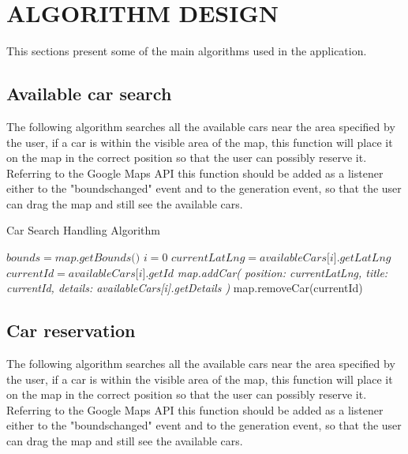 \section{ALGORITHM DESIGN}

This sections present some of the main algorithms used in the application.

\subsection{Available car search}
The following algorithm searches all the available cars near the area specified by the user, if a car
is within the visible area of the map, this function will place it on the map in the correct position
so that the user can possibly reserve it. Referring to the Google Maps API this function should be
added as a listener either to the "bounds\textunderscore changed" event and to the generation event, so
that the user can drag the map and still see the available cars.

\begin{algorithm}
\begin{algorithmic}[1]
  \caption{\label{alg:stdreqhandler} Car Search Handling Algorithm}

    \State $ bounds = \textit{map.getBounds()} $
    \State $ i = \textit{0}$
      \State $ currentLatLng = \textit{availableCars[i].getLatLng} $
      \State $ currentId = \textit{availableCars[i].getId} $
        \State \textit{map.addCar(
          \State position: currentLatLng,
          \State title: currentId,
          \State details: availableCars[i].getDetails
        \State )}
        \State map.removeCar(currentId)
      \EndIf
    \EndFor
  \EndFunction

\end{algorithmic}
\end{algorithm}

\pagebreak

\subsection{Car reservation}
The following algorithm searches all the available cars near the area specified by the user, if a car
is within the visible area of the map, this function will place it on the map in the correct position
so that the user can possibly reserve it. Referring to the Google Maps API this function should be
added as a listener either to the "bounds\textunderscore changed" event and to the generation event, so
that the user can drag the map and still see the available cars.

